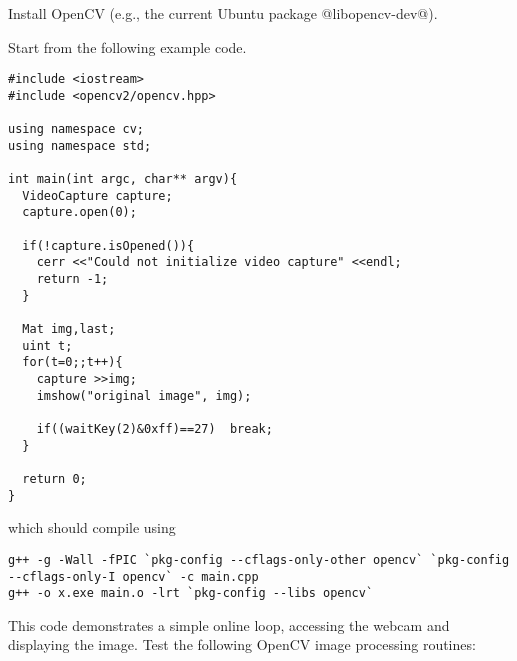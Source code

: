 

\renewcommand{\course}{Robotics}
\renewcommand{\coursepicture}{roboticsLecture}
\renewcommand{\coursedate}{Winter 2014}
\renewcommand{\exnum}{15}

\exercises


\exercisestitle



Install OpenCV (e.g., the current Ubuntu package @libopencv-dev@).

Start from the following example code.

\begin{code}
\begin{verbatim}
#include <iostream>
#include <opencv2/opencv.hpp>

using namespace cv;
using namespace std;

int main(int argc, char** argv){
  VideoCapture capture;
  capture.open(0);

  if(!capture.isOpened()){
    cerr <<"Could not initialize video capture" <<endl;
    return -1;
  }

  Mat img,last;
  uint t;
  for(t=0;;t++){
    capture >>img;
    imshow("original image", img);

    if((waitKey(2)&0xff)==27)  break;
  }

  return 0;
}
\end{verbatim}
\end{code}
which should compile using\\
\begin{code}
\begin{verbatim}
g++ -g -Wall -fPIC `pkg-config --cflags-only-other opencv` `pkg-config --cflags-only-I opencv` -c main.cpp
g++ -o x.exe main.o -lrt `pkg-config --libs opencv`
\end{verbatim}
\end{code}

This code demonstrates a simple online loop, accessing the webcam and
displaying the image. Test the following
OpenCV image processing routines:

